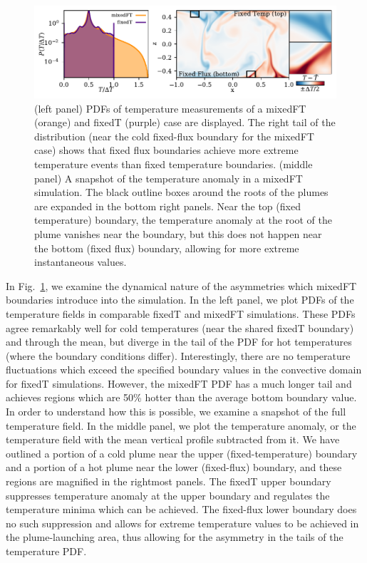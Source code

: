 \documentclass[aps, pre, onecolumn, nofootinbib, notitlepage, groupedaddress, amsfonts, amssymb, amsmath, longbibliography, superscriptaddress]{revtex4-1}
\begin{document}
\begin{figure}
\includegraphics[width=\textwidth]{./figs/rbc_dynamics_asymmetries.pdf}
\caption{ 
	(left panel) PDFs of temperature measurements of a mixedFT (orange) and fixedT (purple) case are displayed.
	The right tail of the distribution (near the cold fixed-flux boundary for the mixedFT case) shows that fixed flux boundaries achieve more extreme temperature events than fixed temperature boundaries.
	(middle panel) A snapshot of the temperature anomaly in a mixedFT simulation.
	The black outline boxes around the roots of the plumes are expanded in the bottom right panels.
	Near the top (fixed temperature) boundary, the temperature anomaly at the root of the plume vanishes near the boundary, but this does not happen near the bottom (fixed flux) boundary, allowing for more extreme instantaneous values.
\label{fig:rbc_dynamics_asymmetries} }
\end{figure}

In Fig.~\ref{fig:rbc_dynamics_asymmetries}, we examine the dynamical nature of the asymmetries which mixedFT boundaries introduce into the simulation.
In the left panel, we plot PDFs of the temperature fields in comparable fixedT and mixedFT simulations.
These PDFs agree remarkably well for cold temperatures (near the shared fixedT boundary) and through the mean, but diverge in the tail of the PDF for hot temperatures (where the boundary conditions differ).
Interestingly, there are no temperature fluctuations which exceed the specified boundary values in the convective domain for fixedT simulations.
However, the mixedFT PDF has a much longer tail and achieves regions which are 50\% hotter than the average bottom boundary value.
In order to understand how this is possible, we examine a snapshot of the full temperature field.
In the middle panel, we plot the temperature anomaly, or the temperature field with the mean vertical profile subtracted from it.
We have outlined a portion of a cold plume near the upper (fixed-temperature) boundary and a portion of a hot plume near the lower (fixed-flux) boundary, and these regions are magnified in the rightmost panels.
The fixedT upper boundary suppresses temperature anomaly at the upper boundary and regulates the temperature minima which can be achieved.
The fixed-flux lower boundary does no such suppression and allows for extreme temperature values to be achieved in the plume-launching area, thus allowing for the asymmetry in the tails of the temperature PDF.
\end{document}
